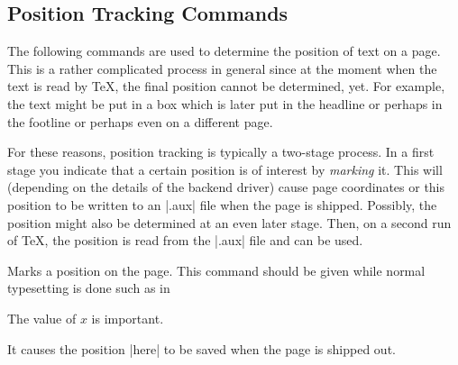 \subsection{Position Tracking Commands}

The following commands are used to determine the position of text on a
page. This is a rather complicated process in general since at the
moment when the text is read by \TeX, the final position cannot be
determined, yet. For example, the text might be put in a box which is
later put in the headline or perhaps in the footline or perhaps even
on a different page.

For these reasons, position tracking is typically a two-stage
process. In a first stage you indicate that a certain position is of
interest by \emph{marking} it. This will (depending on the details of
the backend driver) cause page coordinates or this position to be
written to an |.aux| file when the page is shipped. Possibly, the
position might also be determined at an even later stage. Then, on a
second run of \TeX, the position is read from the |.aux| file and can
be used.

\begin{command}{\pgfsys@markposition{}}
  Marks a position on the page. This command should be given while
  normal typesetting is done such as in
\begin{codeexample}
The value of $x$ is important.
\end{codeexample}
  It causes the position |here| to be saved when the page is shipped
  out.
\end{command}

